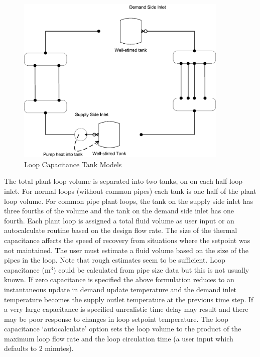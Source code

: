 \begin{figure}[hbtp] %
\centering
\includegraphics[width=0.9\textwidth, height=0.9\textheight, keepaspectratio=true]{media/image1962.png}
\caption{Loop Capacitance Tank Models \protect \label{fig:loop-capacitance-tank-models}}
\end{figure}

The total plant loop volume is separated into two tanks, on on each half-loop inlet. For normal loops (without common pipes) each tank is one half of the plant loop volume. For common pipe plant loops, the tank on the supply side inlet has three fourths of the volume and the tank on the demand side inlet has one fourth. Each plant loop is assigned a total fluid volume as user input or an autocalculate routine based on the design flow rate. The size of the thermal capacitance affects the speed of recovery from situations where the setpoint was not maintained. The user must estimate a fluid volume based on the size of the pipes in the loop. Note that rough estimates seem to be sufficient. Loop capacitance (m\(^{3}\)) could be calculated from pipe size data but this is not usually known. If zero capacitance is specified the above formulation reduces to an instantaneous update in demand update temperature and the demand inlet temperature becomes the supply outlet temperature at the previous time step. If a very large capacitance is specified unrealistic time delay may result and there may be poor response to changes in loop setpoint temperature.  The loop capacitance `autocalculate' option sets the loop volume to the product of the maximum loop flow rate and the loop circulation time (a user input which defaults to 2 minutes).

